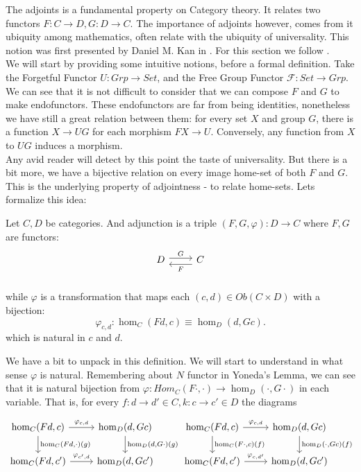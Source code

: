 The adjoints is a fundamental property on Category theory. It relates two functors $F:C\to D, G:D\to C$. The importance of adjoints however, comes from it ubiquity among mathematics, often relate with the ubiquity of universality. This notion was first presented by Daniel M. Kan in \cite{kan1958adjoint}. For this section we follow \cite{mac2013categories}.\\

We  will start by providing some intuitive notions, before a formal definition. Take the Forgetful Functor $U:Grp\to Set$, and the Free Group Functor $\mathcal{F}:Set\to Grp$. We can see that it is not difficult to consider that we can compose $F$ and $G$ to make endofunctors. These endofunctors are far from being identities, nonetheless we have still a great relation between them: for every set $X$ and group $G$, there is a function $X \to UG$ for each morphism $FX\to U$. Conversely, any function from $X$ to $UG$ induces a morphism. \\

Any avid reader will detect by this point the taste of universality. But there is a bit more, we have a bijective relation on every image home-set of both $F$ and $G$. This is the underlying property of adjointness - to relate home-sets. Lets formalize this idea:
\begin{definition}
  Let $C,D$ be categories. And adjunction is a triple $(F,G,\varphi):D\to C$ where $F,G$ are functors:
  \[
    \begin{tikzcd}
      D\arrow[r, shift left=.5ex, "G"{name=F}] &
      C\arrow[l, shift left=1ex, "F"{name=G}] \\
    \end{tikzcd}
  \]
  while $\varphi$ is a transformation that maps each $(c,d) \in Ob(C\times D)$ with a bijection:
  \[
    \varphi_{c,d}:\hom_C(Fd, c)\equiv\hom_D(d, Gc).
  \]
  which is natural in $c$ and $d$.
\end{definition}

We have a bit to unpack in this definition. We will start to understand in what sense $\varphi$ is natural. Remembering about $N$ functor in Yoneda's Lemma, we can see that it is natural bijection from $\varphi:Hom_C(F\cdot, \cdot)\to \hom_D(\cdot, G\cdot)$ in each variable. That is,  for every $f:d\to d'\in C,k:c\to c' \in D$ the diagrams

\[
\begin{tikzcd}
 \hom_C(Fd,c) \arrow{d}{\hom_C(Fd,\cdot)(g)}\arrow{r}{\varphi_{c,d}}
 &\hom_D(d,Gc)\arrow{d}{\hom_D(d,G\cdot)(g)}&
   \hom_C(Fd,c) \arrow{d}{\hom_C(F\cdot,c)(f)}\arrow{r}{\varphi_{c,d}}
    &\hom_D(d,Gc)\arrow{d}{\hom_D(\cdot,Gc)(f)}\\
 \hom_C(Fd,c') \arrow{r}{\varphi_{c',d}}  &\hom_D(d,Gc')&
    \hom_C(Fd,c') \arrow{r}{\varphi_{c,d'}}  &\hom_D(d,Gc')
  \end{tikzcd}
\]

